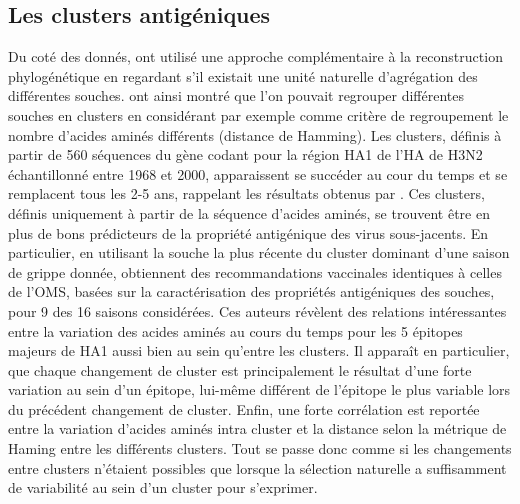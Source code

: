 
\subsection{Les clusters antigéniques}
\label{sec:intro:clusters}

Du coté des donnés, \citet{Plotkin2002} ont utilisé une approche
complémentaire à la reconstruction phylogénétique en regardant s'il
existait une unité naturelle d'agrégation des différentes souches.
\citet{Plotkin2002} ont ainsi montré que l'on pouvait regrouper
différentes souches en clusters en considérant par exemple comme
critère de regroupement le nombre d'acides aminés différents (distance
de Hamming). Les clusters, définis à partir de 560 séquences du gène
codant pour la région HA1 de l'HA de H3N2 échantillonné entre 1968 et
2000, apparaissent se succéder au cour du temps et se remplacent tous
les 2-5 ans, rappelant les résultats obtenus par \citet{Gog2002}. Ces
clusters, définis uniquement à partir de la séquence d'acides aminés,
se trouvent être en plus de bons prédicteurs de la propriété
antigénique des virus sous-jacents. En particulier, en utilisant la
souche la plus récente du cluster dominant d'une saison de grippe
donnée, \citet{Plotkin2002} obtiennent des recommandations vaccinales
identiques à celles de l'OMS, basées sur la caractérisation des
propriétés antigéniques des souches, pour 9 des 16 saisons
considérées. Ces auteurs révèlent des relations intéressantes entre la
variation des acides aminés au cours du temps pour les 5 épitopes
majeurs de HA1 aussi bien au sein qu'entre les clusters. Il apparaît
en particulier, que chaque changement de cluster est principalement le
résultat d'une forte variation au sein d'un épitope, lui-même
différent de l'épitope le plus variable lors du précédent changement
de cluster. Enfin, une forte corrélation est reportée entre la
variation d'acides aminés intra cluster et la distance selon la
métrique de Haming entre les différents clusters. Tout se passe donc
comme si les changements entre clusters n'étaient possibles que
lorsque la sélection naturelle a suffisamment de variabilité au sein
d'un cluster pour s'exprimer.

